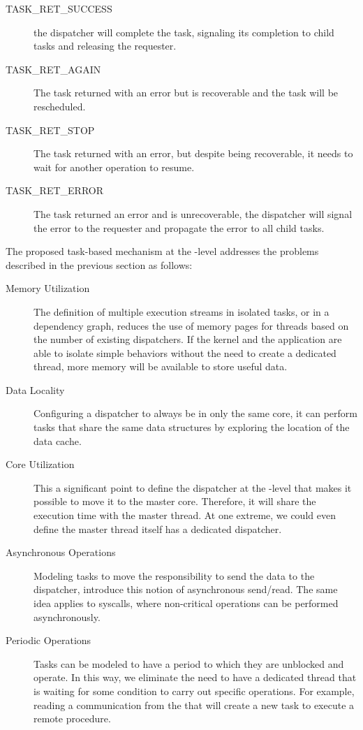 	\begin{description}
		\item[TASK\_RET\_SUCCESS] the dispatcher will complete the task,
			signaling its completion to child tasks and releasing the
			requester.
		\item[TASK\_RET\_AGAIN] The task returned with an error but is
			recoverable and the task will be rescheduled.
		\item[TASK\_RET\_STOP] The task returned with an error, but despite
			being recoverable, it needs to wait for another operation to
			resume.
		\item[TASK\_RET\_ERROR] The task returned an error and is
			unrecoverable, the dispatcher will signal the error to the
			requester and propagate the error to all child tasks.
	\end{description}
	The proposed task-based mechanism at the \os-level addresses the problems
	described in the previous section as follows:
	\begin{description}
		\item[Memory Utilization] The definition of multiple execution streams
			in isolated tasks, or in a dependency graph, reduces the use of
			memory pages for threads based on the number of existing
			dispatchers. If the kernel and the application are able to isolate
			simple behaviors without the need to create a dedicated thread,
			more memory will be available to store useful data.

		\item[Data Locality] Configuring a dispatcher to always be in only the
			same core, it can perform tasks that share the same data structures
			by exploring the location of the data cache.

		\item[Core Utilization] This a significant point to define the
			dispatcher at the \os-level that makes it possible to move it to the
			master core. Therefore, it will share the execution time with the
			master thread. At one extreme, we could even define the master
			thread itself has a dedicated dispatcher.

		\item[Asynchronous Operations] Modeling tasks to move the
			responsibility to send the data to the dispatcher, introduce this
			notion of asynchronous send/read. The same idea applies to
			syscalls, where non-critical operations can be performed
			asynchronously.

		\item[Periodic Operations] Tasks can be modeled to have a period to
			which they are unblocked and operate. In this way, we eliminate the
			need to have a dedicated thread that is waiting for some condition
			to carry out specific operations. For example, reading
			a communication from the \noc that will create a new task to execute
			a remote procedure.
	\end{description}


